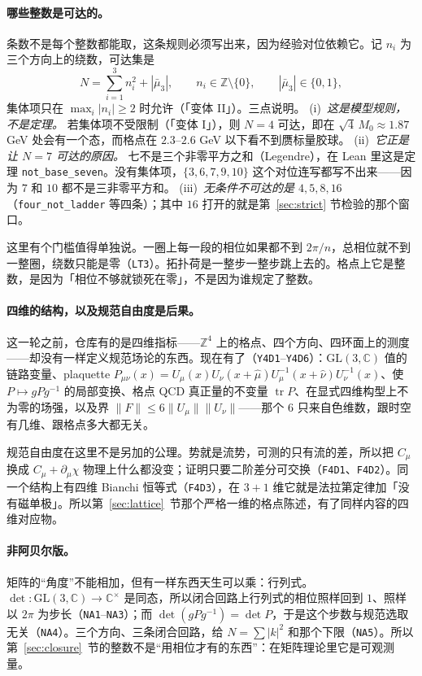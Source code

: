 \documentclass[aps,prd,preprint,superscriptaddress,amsmath,amssymb]{revtex4-2}
\begin{document}
\paragraph{哪些整数是可达的。}
条数不是每个整数都能取，这条规则必须写出来，因为经验对位依赖它。记 $n_i$ 为三个方向上的绕数，可达集是
\begin{equation}
N=\sum_{i=1}^{3} n_i^2 + |\bar\mu_3|,
\qquad n_i\in\mathbb Z\setminus\{0\},\qquad |\bar\mu_3|\in\{0,1\},
\label{eq:ladder-rule-zh}
\end{equation}
集体项只在 $\max_i|n_i|\ge 2$ 时允许（「变体 II」）。三点说明。
(i)~\emph{这是模型规则，不是定理。} 若集体项不受限制（「变体 I」），则 $N=4$ 可达，即在 $\sqrt4\,M_0\approx1.87$ GeV 处会有一个态，而格点在 $2.3$--$2.6$ GeV 以下看不到赝标量胶球。
(ii)~\emph{它正是让 $N=7$ 可达的原因。} 七不是三个非零平方之和（Legendre），在 Lean 里这是定理 \texttt{not\_base\_seven}。没有集体项，$\{3,6,7,9,10\}$ 这个对位连写都写不出来——因为 $7$ 和 $10$ 都不是三非零平方和。
(iii)~\emph{无条件不可达的是 $4,5,8,16$}（\texttt{four\_not\_ladder} 等四条）；其中 $16$ 打开的就是第~\ref{sec:strict} 节检验的那个窗口。

这里有个门槛值得单独说。一圈上每一段的相位如果都不到 $2\pi/n$，总相位就不到一整圈，绕数只能是零（\texttt{LT3}）。拓扑荷是一整步一整步跳上去的。格点上它是整数，是因为「相位不够就锁死在零」，不是因为谁规定了整数。

\paragraph{四维的结构，以及规范自由度是后果。}
这一轮之前，仓库有的是四维指标——$\mathbb{Z}^4$ 上的格点、四个方向、四环面上的测度——却没有一样定义规范场论的东西。现在有了（\texttt{Y4D1}--\texttt{Y4D6}）：$\mathrm{GL}(3,\mathbb{C})$ 值的链路变量、plaquette $P_{\mu\nu}(x)=U_\mu(x)U_\nu(x+\hat\mu)U^{-1}_\mu(x+\hat\nu)U^{-1}_\nu(x)$、使 $P\mapsto gPg^{-1}$ 的局部变换、格点 QCD 真正量的不变量 $\operatorname{tr}P$、在显式四维构型上不为零的场强，以及界 $\|F\|\le 6\|U_\mu\|\|U_\nu\|$——那个 $6$ 只来自色维数，跟时空有几维、跟格点多大都无关。

规范自由度在这里不是另加的公理。势就是流势，可测的只有流的差，所以把 $C_\mu$ 换成 $C_\mu+\partial_\mu\chi$ 物理上什么都没变；证明只要二阶差分可交换（\texttt{F4D1}、\texttt{F4D2}）。同一个结构上有四维 Bianchi 恒等式（\texttt{F4D3}），在 $3+1$ 维它就是法拉第定律加「没有磁单极」。所以第~\ref{sec:lattice}~节那个严格一维的格点陈述，有了同样内容的四维对应物。

\paragraph{非阿贝尔版。}
矩阵的“角度”不能相加，但有一样东西天生可以乘：行列式。$\det:\mathrm{GL}(3,\mathbb{C})\to\mathbb{C}^{\times}$ 是同态，所以闭合回路上行列式的相位照样回到 $1$、照样以 $2\pi$ 为步长（\texttt{NA1}--\texttt{NA3}）；而 $\det(gPg^{-1})=\det P$，于是这个步数与规范选取无关（\texttt{NA4}）。三个方向、三条闭合回路，给 $N=\sum|k|^2$ 和那个下限（\texttt{NA5}）。所以第~\ref{sec:closure}~节的整数不是“用相位才有的东西”：在矩阵理论里它是可观测量。
\end{document}
